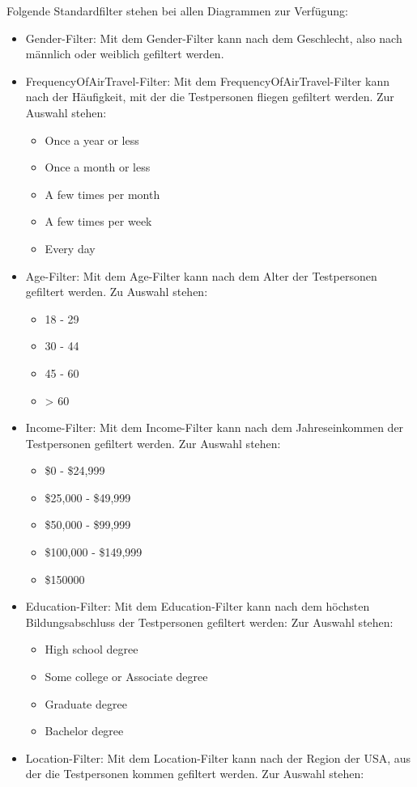 \documentclass{scrartcl}
\begin{document}
Folgende Standardfilter stehen bei allen Diagrammen zur Verfügung:
\begin{itemize}
\item Gender-Filter: Mit dem Gender-Filter kann nach dem Geschlecht, also nach männlich oder weiblich gefiltert werden.
\item FrequencyOfAirTravel-Filter: Mit dem FrequencyOfAirTravel-Filter kann nach der Häufigkeit, mit der die Testpersonen fliegen gefiltert werden. Zur Auswahl stehen: 
	\begin{itemize}
	\item Once a year or less
	\item Once a month or less
	\item A few times per month
	\item A few times per week
	\item Every day
	\end{itemize}
\item Age-Filter: Mit dem Age-Filter kann nach dem Alter der Testpersonen gefiltert werden. Zu Auswahl stehen: 
	\begin{itemize}
	\item 18 - 29
	\item 30 - 44
	\item 45 - 60
	\item > 60
	\end{itemize}
\item Income-Filter: Mit dem Income-Filter kann nach dem Jahreseinkommen der Testpersonen gefiltert werden. Zur Auswahl stehen: 
	\begin{itemize}
	\item \$0 - \$24,999
	\item \$25,000 - \$49,999
	\item \$50,000 - \$99,999
	\item \$100,000 - \$149,999
	\item \$150000
	\end{itemize}
\item Education-Filter: Mit dem Education-Filter kann nach dem höchsten Bildungsabschluss der Testpersonen gefiltert werden: Zur Auswahl stehen:
	\begin{itemize}
	\item High school degree
	\item Some college or Associate degree
	\item Graduate degree
	\item Bachelor degree
	\end{itemize}
\item Location-Filter: Mit dem Location-Filter kann nach der Region der USA, aus der die Testpersonen kommen gefiltert werden. Zur Auswahl stehen:

\end{itemize}
\end{document}

